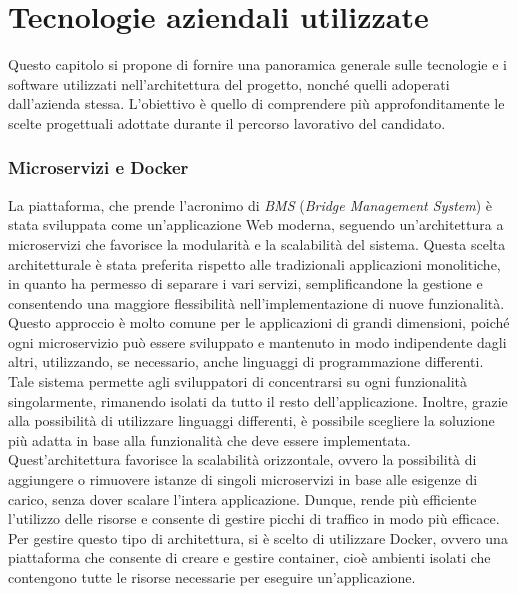 \chapter{Tecnologie aziendali utilizzate}
\label{cap:chapter3}

Questo capitolo si propone di fornire una panoramica generale sulle tecnologie e i software utilizzati nell'architettura del progetto, nonché quelli adoperati dall'azienda stessa. L'obiettivo è quello di comprendere più approfonditamente le scelte progettuali adottate durante il percorso lavorativo del candidato.

\subsection{Microservizi e Docker}

La piattaforma, che prende l'acronimo di \textit{BMS} (\textit{Bridge Management System}) è stata sviluppata come un'applicazione Web moderna, seguendo un'architettura a microservizi che favorisce la modularità e la scalabilità del sistema. Questa scelta architetturale è stata preferita rispetto alle tradizionali applicazioni monolitiche, in quanto ha permesso di separare i vari servizi, semplificandone la gestione e consentendo una maggiore flessibilità nell'implementazione di nuove funzionalità.
\\Questo approccio è molto comune per le applicazioni di grandi dimensioni, poiché ogni microservizio può essere sviluppato e mantenuto in modo indipendente dagli altri, utilizzando, se necessario, anche linguaggi di programmazione differenti. Tale sistema permette agli sviluppatori di concentrarsi su ogni funzionalità singolarmente, rimanendo isolati da tutto il resto dell'applicazione. Inoltre, grazie alla possibilità di utilizzare linguaggi differenti, è possibile scegliere la soluzione più adatta in base alla funzionalità che deve essere implementata. Quest'architettura favorisce la scalabilità orizzontale, ovvero la possibilità di aggiungere o rimuovere istanze di singoli microservizi in base alle esigenze di carico, senza dover scalare l'intera applicazione. Dunque, rende più efficiente l'utilizzo delle risorse e consente di gestire picchi di traffico in modo più efficace.
\\Per gestire questo tipo di architettura, si è scelto di utilizzare Docker, ovvero una piattaforma che consente di creare e gestire container, cioè ambienti isolati che contengono tutte le risorse necessarie per eseguire un'applicazione.
